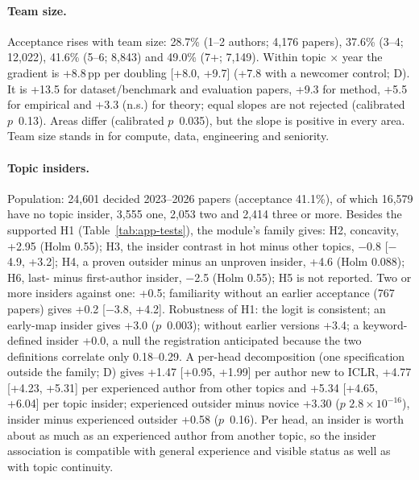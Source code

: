 \paragraph{Team size.} Acceptance rises with team size: 28.7\% (1--2 authors; 4,176 papers), 37.6\% (3--4; 12,022),
41.6\% (5--6; 8,843) and 49.0\% (7+; 7,149). Within topic $\times$ year the gradient is +8.8\,pp per doubling [+8.0,
+9.7] (+7.8 with a newcomer control; D). It is +13.5 for dataset/benchmark and evaluation papers, +9.3 for method,
+5.5 for empirical and +3.3 (n.s.) for theory; equal slopes are not rejected (calibrated $p$~0.13). Areas differ
(calibrated $p$~0.035), but the slope is positive in every area. Team size stands in for compute, data, engineering
and seniority.

\paragraph{Topic insiders.} Population: 24,601 decided 2023--2026 papers (acceptance 41.1\%), of which 16,579 have no
topic insider, 3,555 one, 2,053 two and 2,414 three or more. Besides the supported H1 (Table~\ref{tab:app-tests}), the
module's family gives: H2, concavity, +2.95 (Holm 0.55); H3, the insider contrast in hot minus other topics, $-$0.8
[$-$4.9, +3.2]; H4, a proven outsider minus an unproven insider, +4.6 (Holm 0.088); H6, last- minus first-author
insider, $-$2.5 (Holm 0.55); H5 is not reported. Two or more insiders against one: +0.5;
familiarity without an earlier acceptance (767 papers) gives +0.2 [$-$3.8, +4.2]. Robustness of H1: the logit is
consistent; an early-map insider gives +3.0 ($p$~0.003); without earlier versions +3.4; a keyword-defined insider
+0.0, a null the registration anticipated because the two definitions correlate only 0.18--0.29. A per-head
decomposition (one specification outside the family; D) gives +1.47 [+0.95, +1.99] per author new to ICLR, +4.77
[+4.23, +5.31] per experienced author from other topics and +5.34 [+4.65, +6.04] per topic insider; experienced
outsider minus novice +3.30 ($p$ $2.8\times10^{-16}$), insider minus experienced outsider +0.58 ($p$~0.16). Per head,
an insider is worth about as much as an experienced author from another topic, so the insider association is
compatible with general experience and visible status as well as with topic continuity.

